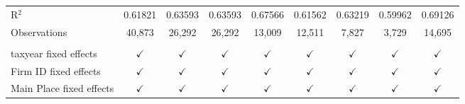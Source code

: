 {\begin{tabular}{lcccccccc}
    \\
   R$^2$                                   & 0.61821       & 0.63593        & 0.63593        & 0.67566        & 0.61562        & 0.63219       & 0.59962       & 0.69126\\  
   Observations                            & 40,873        & 26,292         & 26,292         & 13,009         & 12,511         & 7,827         & 3,729         & 14,695\\  
    \\
   taxyear fixed effects                   & $\checkmark$  & $\checkmark$   & $\checkmark$   & $\checkmark$   & $\checkmark$   & $\checkmark$  & $\checkmark$  & $\checkmark$\\   
   Firm ID fixed effects                   & $\checkmark$  & $\checkmark$   & $\checkmark$   & $\checkmark$   & $\checkmark$   & $\checkmark$  & $\checkmark$  & $\checkmark$\\   
   Main Place fixed effects                & $\checkmark$  & $\checkmark$   & $\checkmark$   & $\checkmark$   & $\checkmark$   & $\checkmark$  & $\checkmark$  & $\checkmark$\\   
   \bottomrule
\end{tabular}
}
